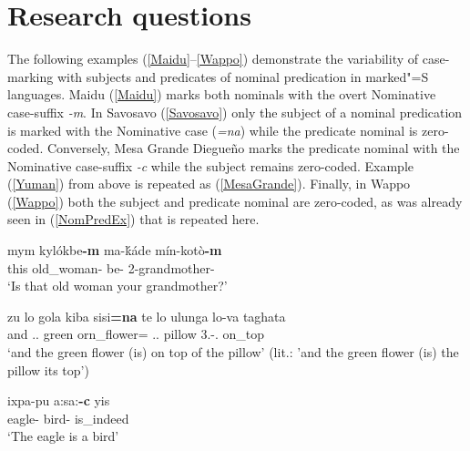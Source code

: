 \section{Research questions}\label{NomPredData}

The following examples (\ref{Maidu}--\ref{Wappo}) demonstrate the variability of case-marking with subjects and predicates of nominal predication in marked"=S languages. 
Maidu (\ref{Maidu}) marks both nominals with the overt Nominative case-suffix \emph{-m}.
In Savosavo (\ref{Savosavo}) only the subject of a nominal predication is marked with the Nominative case (\emph{=na}) while the predicate nominal is zero-coded.
Conversely, Mesa Grande Diegue{\~n}o marks the predicate nominal with the Nominative case-suffix \emph{-c} while the subject remains zero-coded. 
Example (\ref{Yuman}) from above is repeated as (\ref{MesaGrande}).
Finally, in Wappo (\ref{Wappo}) both the subject and predicate nominal are zero-coded, as was already seen in (\ref{NomPredEx}) that is repeated here.       


\begin{exe}\ex\label{Maidu}
\gll mym kyl\'okbe\textbf{-m} ma-\'k\'ade m\'in-kot\`o\textbf{-m}\\
     this old\_woman-\nom{} be-\question{} 2-grandmother-\nom{}\\
 \glt    `Is that old woman your grandmother?'
\end{exe}


\begin{exe}\ex\label{Savosavo}
\raggedright\gll zu lo {gola kiba} sisi\textbf{=na} te lo ulunga lo-va taghata\\
and \deter{}.\sg{}.\mas{} green orn\_flower=\nom{} \emphat{} \deter{}.\sg{}.\mas{} pillow 3\sg{}.\mas{}-\gen{}.\mas{} on\_top\\
\glt `and the green flower (is) on top of the pillow' (lit.: 'and the green flower (is) the pillow its top')
\end{exe}


\begin{exe}\ex\label{MesaGrande}
\gll ixpa-pu a:sa:\textbf{-c} yis\\
		eagle-\dem{} bird-\nom{} is\_indeed\\
	\glt	`The eagle is a bird'
\end{exe}

